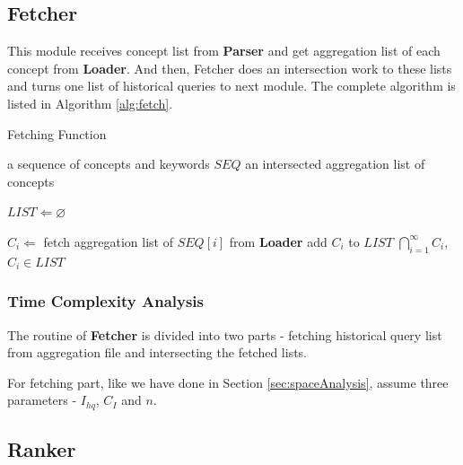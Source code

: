 \subsection{Fetcher}
This module receives concept list from \textbf{Parser} and get aggregation list of each concept from \textbf{Loader}. And then, Fetcher does an intersection work to these lists and turns one list of historical queries to next module. The complete algorithm is listed in Algorithm \ref{alg:fetch}.

\begin{algorithm}
\caption{Fetching Function}
\label{alg:fetch}
\begin{algorithmic} [1]
  \REQUIRE a sequence of concepts and keywords $SEQ$
  \ENSURE an intersected aggregation list of concepts

  \STATE $LIST \Leftarrow \varnothing$

      \STATE $C_i \Leftarrow$ fetch aggregation list of $SEQ[i]$ from \textbf{Loader}
      \STATE add $C_i$ to $LIST$
    \ENDIF
  \ENDFOR
  \RETURN $\bigcap_{i=1}^{\infty} C_i$, $C_i \in LIST$
\end{algorithmic}
\end{algorithm}

\subsubsection{Time Complexity Analysis}
The routine of \textbf{Fetcher} is divided into two parts - fetching historical query list from aggregation file and intersecting the fetched lists.

For fetching part, like we have done in Section \ref{sec:spaceAnalysis}, assume three parameters - $I_{hq}$, $C_I$ and $n$.

\subsection{Ranker}
